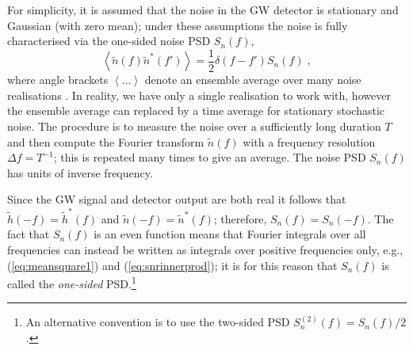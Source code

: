 For simplicity, it is assumed that the noise in the GW detector is stationary and Gaussian (with zero mean); under these assumptions the noise is fully characterised via the one-sided noise PSD $S_{n}(f)$, 
\begin{equation}\label{eq:psd}
\left<\tilde{n}(f)\tilde{n}^{*}(f')\right>=\frac{1}{2}\delta (f-f')S_{n}(f) \; ,
\end{equation}
where angle brackets $\left<\ldots\right>$ denote an ensemble average over many noise realisations \citep{Cutler1994}. In reality, we have only a single realisation to work with, however the ensemble average can replaced by a time average for stationary stochastic noise. The procedure is to measure the noise over a sufficiently long duration $T$ and then compute the Fourier transform $\tilde{n}(f)$ with a frequency resolution $\Delta f = T^{-1}$; this is repeated many times to give an average. The noise PSD $S_{n}(f)$ has units of inverse frequency.

Since the GW signal and detector output are both real it follows that $\tilde{h}(-f)=\tilde{h}^{*}(f)$ and $\tilde{n}(-f)=\tilde{n}^{*}(f)$; therefore, $S_{n}(f)=S_{n}(-f)$. The fact that $S_{n}(f)$ is an even function means that Fourier integrals over all frequencies can instead be written as integrals over positive frequencies only, e.g., (\ref{eq:meansquare1}) and (\ref{eq:snrinnerprod}); it is for this reason that $S_{n}(f)$ is called the \emph{one-sided} PSD.\footnote{An alternative convention is to use the two-sided PSD $S^{(2)}_{n}(f) = S_{n}(f)/2$.}

